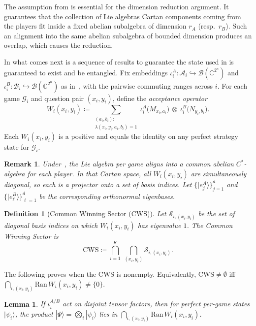 \documentclass{article}
\newtheorem{remark}{Remark}
\newtheorem{definition}{Definition}
\newtheorem{lemma}{Lemma}
\begin{document}
    The assumption from  is essential for the dimension reduction argument. It guarantees that the collection of Lie algebras Cartan components coming from the players fit inside a fixed abelian subalgebra of dimension $r_A$ (resp.\ $r_B$). Such an alignment into the same abelian subalgebra of bounded dimension produces an overlap, which causes the reduction. 

    In what comes next is a sequence of results to guarantee the state used in  is guaranteed to exist and be entangled. Fix embeddings $\iota_i^A:\mathcal{A}_i\hookrightarrow\mathcal{B}(\mathbb{C}^{2^n})$ and  $\iota_i^B:\mathcal{B}_i\hookrightarrow\mathcal{B}(\mathbb{C}^{2^n})$ as in~, with the pairwise commuting ranges across $i$. For each game $\mathcal{G}_i$ and question pair $(x_i,y_i)$, define the \emph{acceptance operator}
    \begin{equation}
        W_i(x_i,y_i)\coloneqq\sum_{\substack{(a_i,b_i):\\\lambda(x_i,y_i,a_i,b_i)=1}} \iota_i^A\big(M_{x_i,a_i}\big)\ \otimes\ \iota_i^B\big(N_{y_i,b_i}\big).
    \end{equation}
    Each $W_i(x_i,y_i)$ is a positive and equals the identity on any perfect strategy state for $\mathcal{G}_i$.

    \begin{remark}
        Under~, the Lie algebra per game aligns into a common abelian $C^*$-algebra for each player. In that Cartan space, all $W_i(x_i,y_i)$ are simultaneously diagonal, so each is a projector onto a set of basis indices. Let $\{|e_j^A\rangle\}_{j=1}^{d}$ and $\{|e_\ell^B\rangle\}_{\ell=1}^{d}$ be the corresponding orthonormal eigenbases. 
    \end{remark}

    \begin{definition}[Common Winning Sector (CWS)]
        Let $\mathcal{S}_{i,(x_i,y_i)}$ be the set of diagonal basis indices on which $W_i(x_i,y_i)$ has eigenvalue $1$. The \emph{Common Winning Sector} is
        \begin{equation}
            \mathrm{CWS}\coloneqq\bigcap_{i=1}^K\ \bigcap_{(x_i,y_i)} \mathcal{S}_{i,(x_i,y_i)}.
        \end{equation}
    \end{definition}
    The following proves when the CWS is nonempty. Equivalently, $\mathrm{CWS}\neq\emptyset$ iff $\bigcap\limits_{i,(x_i,y_i)} \mathrm{Ran}\,W_i(x_i,y_i)\neq\{0\}$. 
    \begin{lemma}\label{lemma: nonempty CWS}
        If $\iota_i^{A/B}$ act on disjoint tensor factors, then for perfect per-game states $|\psi_i\rangle$, the product $|\Psi\rangle=\bigotimes\limits_i|\psi_i\rangle$ lies in $\bigcap\limits_{i,(x_i,y_i)}\mathrm{Ran}\,W_i(x_i,y_i)$.
    \end{lemma}
\end{document}
